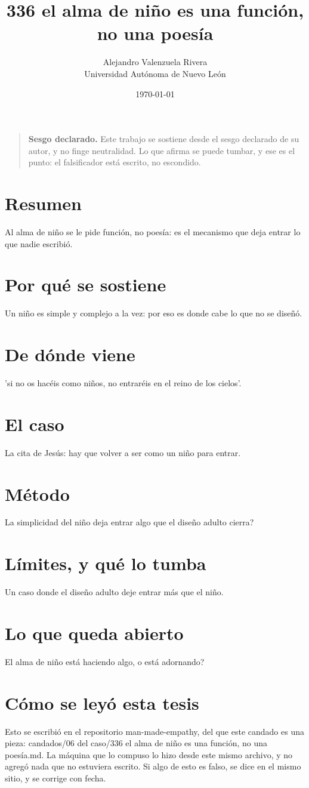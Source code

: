 \documentclass[11pt,a4paper]{article}
\title{336 el alma de niño es una función, no una poesía}
\author{Alejandro Valenzuela Rivera\\\small Universidad Autónoma de Nuevo León}
\date{\today}
\begin{document}
\maketitle

\begin{quote}
\textbf{Sesgo declarado.} Este trabajo se sostiene desde el sesgo declarado de su autor, y no finge neutralidad. Lo que afirma se puede tumbar, y ese es el punto: el falsificador está escrito, no escondido.
\end{quote}

\section*{Resumen}
Al alma de niño se le pide función, no poesía: es el mecanismo que deja entrar lo que nadie escribió.

\section{Por qué se sostiene}
Un niño es simple y complejo a la vez: por eso es donde cabe lo que no se diseñó.

\section{De dónde viene}
'si no os hacéis como niños, no entraréis en el reino de los cielos'.

\section{El caso}
La cita de Jesús: hay que volver a ser como un niño para entrar.

\section{Método}
\textquestiondown{}La simplicidad del niño deja entrar algo que el diseño adulto cierra?

\section{Límites, y qué lo tumba}
Un caso donde el diseño adulto deje entrar más que el niño.

\section{Lo que queda abierto}
\textquestiondown{}El alma de niño está haciendo algo, o está adornando?

\section*{Cómo se leyó esta tesis}
Esto se escribió en el repositorio man-made-empathy, del que este candado es una pieza: candados/06 del caso/336 el alma de niño es una función, no una poesía.md. La máquina que lo compuso lo hizo desde este mismo archivo, y no agregó nada que no estuviera escrito. Si algo de esto es falso, se dice en el mismo sitio, y se corrige con fecha.
\end{document}
